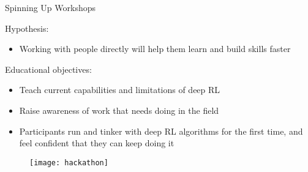 \begin{frame}{Spinning Up Workshops}

Hypothesis:
\begin{itemize}
\item Working with people directly will help them learn and build skills faster
\end{itemize}

Educational objectives:
\begin{itemize}
\item Teach current capabilities and limitations of deep RL
\item Raise awareness of work that needs doing in the field
\item Participants run and tinker with deep RL algorithms for the first time, and feel confident that they can keep doing it
\end{itemize}
\begin{figure}
\centering
\texttt{[image: hackathon]}
\end{figure}

\end{frame}